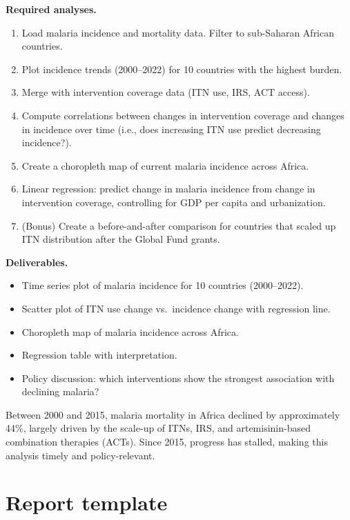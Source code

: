 \textbf{Required analyses.}
\begin{enumerate}
  \item Load malaria incidence and mortality data. Filter to sub-Saharan African countries.
  \item Plot incidence trends (2000--2022) for 10 countries with the highest burden.
  \item Merge with intervention coverage data (ITN use, IRS, ACT access).
  \item Compute correlations between changes in intervention coverage and changes in incidence over time (i.e., does increasing ITN use predict decreasing incidence?).
  \item Create a choropleth map of current malaria incidence across Africa.
  \item Linear regression: predict change in malaria incidence from change in intervention coverage, controlling for GDP per capita and urbanization.
  \item (Bonus) Create a before-and-after comparison for countries that scaled up ITN distribution after the Global Fund grants.
\end{enumerate}

\textbf{Deliverables.}
\begin{itemize}
  \item Time series plot of malaria incidence for 10 countries (2000--2022).
  \item Scatter plot of ITN use change vs.\ incidence change with regression line.
  \item Choropleth map of malaria incidence across Africa.
  \item Regression table with interpretation.
  \item Policy discussion: which interventions show the strongest association with declining malaria?
\end{itemize}

\begin{clinicalnote}
Between 2000 and 2015, malaria mortality in Africa declined by approximately 44\%, largely driven by the scale-up of ITNs, IRS, and artemisinin-based combination therapies (ACTs). Since 2015, progress has stalled, making this analysis timely and policy-relevant.
\end{clinicalnote}

\section{Report template}

